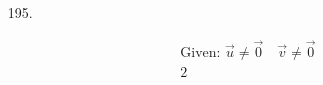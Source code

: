 ﻿\documentclass[10pt, letterpaper]{article}
\begin{document}
\begin{enumerate}
        \item[195.]\mbox{}
        \begin{mdframed}
            \begin{equation*}
                \begin{gathered}
                    \text{Given: } \vec{u} \neq \vec{0} \quad \vec{v} \neq \vec{0}  \\
                    2
                \end{gathered}
            \end{equation*}
        \end{mdframed}
    \end{enumerate}
\end{document}
